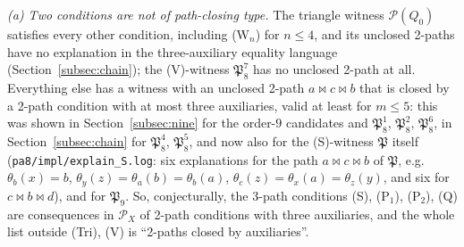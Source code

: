 \documentclass[11pt]{amsart}
\theoremstyle{definition}
\renewcommand{\P}{\mathcal{P}}
\newcommand{\mt}{\bowtie}   %
\begin{document}
\emph{(a) Two conditions are not of path-closing type.} The triangle witness $\P(Q_0)$ satisfies every other condition, including (W$_n$) for $n\le4$, and its unclosed 2-paths have no explanation in the three-auxiliary equality language (Section~\ref{subsec:chain}); the (V)-witness $\mathfrak P_8^7$ has no unclosed 2-path at all. Everything else has a witness with an unclosed 2-path $a\mt c\mt b$ that is closed by a 2-path condition with at most three auxiliaries, valid at least for $m\le5$: this was shown in Section~\ref{subsec:nine} for the order-$9$ candidates and $\mathfrak P_8^1$, $\mathfrak P_8^2$, $\mathfrak P_8^6$, in Section~\ref{subsec:chain} for $\mathfrak P_8^4$, $\mathfrak P_8^5$, and now also for the (S)-witness $\mathfrak P$ itself (\texttt{pa8/impl/explain\_S.log}: six explanations for the path $a\mt c\mt b$ of $\mathfrak P$, e.g.\ $\theta_b(x)=b$, $\theta_y(z)=\theta_a(b)=\theta_b(a)$, $\theta_c(z)=\theta_x(a)=\theta_z(y)$, and six for $c\mt b\mt d$), and for $\mathfrak P_9$. So, conjecturally, the 3-path conditions (S), (P$_1$), (P$_2$), (Q) are consequences in $\P_X$ of 2-path conditions with three auxiliaries, and the whole list outside (Tri), (V) is ``2-paths closed by auxiliaries''.
\end{document}
